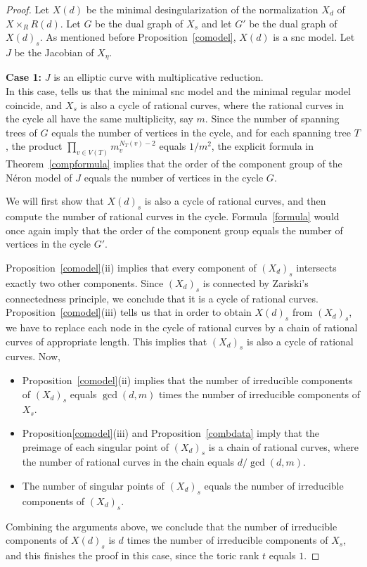\begin{proof}
 Let $X(d)$ be the minimal desingularization of the normalization $X_d$ of $X \times_R R(d)$. Let $G$ be the dual graph of $X_s$ and let $G'$ be the dual graph of $X(d)_s$. As mentioned before Proposition~\ref{comodel}, $X(d)$ is a {\textup{snc}} model. Let $J$ be the Jacobian of $X_\eta$.
  
 {\bf{Case 1:}} $J$ is an elliptic curve with multiplicative reduction.\\
  In this case, \cite[Theorem~6.6]{llr} tells us that the minimal {\textup{snc}} model and the minimal regular model coincide, and $X_s$ is also a cycle of rational curves, where the rational curves in the cycle all have the same multiplicity, say $m$. Since the number of spanning trees of $G$ equals the number of vertices in the cycle, and for each spanning tree $T$, the product $\prod_{v \in V(T)} m_v^{N_T(v)-2}$ equals $1/m^2$, the explicit formula in Theorem~\ref{compformula} implies that the order of the component group of the N\'{e}ron model of $J$ equals the number of vertices in the cycle $G$.   
  
  We will first show that $X(d)_s$ is also a cycle of rational curves, and then compute the number of rational curves in the cycle. Formula~\ref{formula} would once again imply that the order of the component group equals the number of vertices in the cycle $G'$.
 
 Proposition~\ref{comodel}(ii) implies that every component of $(X_d)_s$  intersects exactly two other components. Since $(X_d)_s$ is connected by Zariski's connectedness principle, we conclude that it is a cycle of rational curves. Proposition~\ref{comodel}(iii) tells us that in order to obtain $X(d)_s$ from $(X_d)_s$, we have to replace each node in the cycle of rational curves by a chain of rational curves of appropriate length. This implies that $(X_d)_s$ is also a cycle of rational curves. Now,
 \begin{itemize}
  \item Proposition~\ref{comodel}(ii) implies that the number of irreducible components of $(X_d)_s$ equals $\gcd(d,m)$ times the number of irreducible components of $X_s$. 
  \item Proposition\ref{comodel}(iii) and Proposition~\ref{combdata} imply that the preimage of each singular point of $(X_d)_s$ is a chain of rational curves, where the number of rational curves in the chain equals $d/\gcd(d,m)$. 
  \item The number of singular points of $(X_d)_s$ equals the number of irreducible components of $(X_d)_s$. 
 \end{itemize}
 Combining the arguments above, we conclude that the number of irreducible components of $X(d)_s$ is $d$ times the number of irreducible components of $X_s$, and this finishes the proof in this case, since the toric rank $t$ equals $1$.
 

\end{proof}
